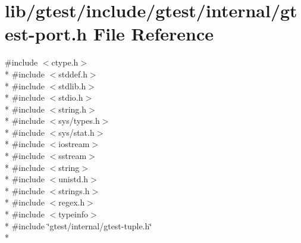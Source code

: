 \hypertarget{gtest-port_8h}{\section{lib/gtest/include/gtest/internal/gtest-\/port.h File Reference}
\label{gtest-port_8h}
}
{\ttfamily \#include $<$ctype.\-h$>$}\\*
{\ttfamily \#include $<$stddef.\-h$>$}\\*
{\ttfamily \#include $<$stdlib.\-h$>$}\\*
{\ttfamily \#include $<$stdio.\-h$>$}\\*
{\ttfamily \#include $<$string.\-h$>$}\\*
{\ttfamily \#include $<$sys/types.\-h$>$}\\*
{\ttfamily \#include $<$sys/stat.\-h$>$}\\*
{\ttfamily \#include $<$iostream$>$}\\*
{\ttfamily \#include $<$sstream$>$}\\*
{\ttfamily \#include $<$string$>$}\\*
{\ttfamily \#include $<$unistd.\-h$>$}\\*
{\ttfamily \#include $<$strings.\-h$>$}\\*
{\ttfamily \#include $<$regex.\-h$>$}\\*
{\ttfamily \#include $<$typeinfo$>$}\\*
{\ttfamily \#include \char`\"{}gtest/internal/gtest-\/tuple.\-h\char`\"{}}\\*
